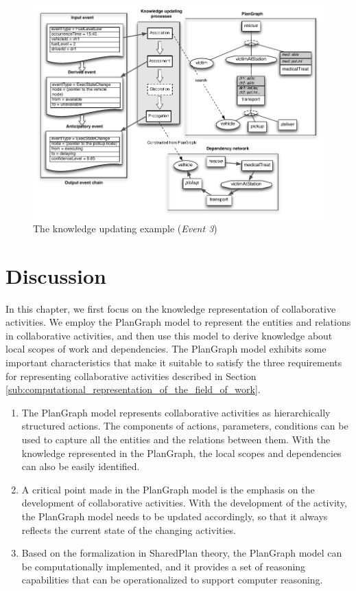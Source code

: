 \begin{figure}[htbp] %
	\centering
	\includegraphics{update_example_event3.pdf} 
	\caption{The knowledge updating example (\emph{Event 3})}
	\label{fig:update_example_event3}
\end{figure}

\section{Discussion} %
\label{sec:knowledge_representation_discussion}
In this chapter, we first focus on the knowledge representation of collaborative activities. We employ the PlanGraph model to represent the entities and relations in collaborative activities, and then use this model to derive knowledge about local scopes of work and dependencies. The PlanGraph model exhibits some important characteristics that make it suitable to satisfy the three requirements for representing collaborative activities described in Section \ref{sub:computational_representation_of_the_field_of_work}.

\begin{enumerate}
   \item The PlanGraph model represents collaborative activities as hierarchically structured actions. The components of actions, parameters, conditions can be used to capture all the entities and the relations between them. With the knowledge represented in the PlanGraph, the local scopes and dependencies can also be easily identified. 
   \item A critical point made in the PlanGraph model is the emphasis on the development of collaborative activities. With the development of the activity, the PlanGraph model needs to be updated accordingly, so that it always  reflects the current state of the changing activities.
   \item Based on the formalization in SharedPlan theory, the PlanGraph model can be computationally implemented, and it provides a set of reasoning capabilities that can be operationalized to support computer reasoning.  
\end{enumerate}

